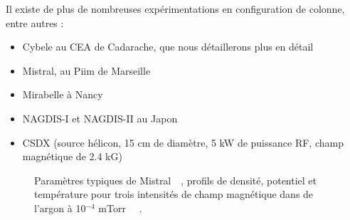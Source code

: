 \begin{refsection}
Il existe de plus de nombreuses expérimentations en
configuration de colonne, entre autres :

\begin{itemize}
  \item Cybele au CEA de Cadarache, que nous détaillerons plus en détail
  \item Mistral, au Piim de
  Marseille\parencite{Pierre, PierreExp, Brochard, Oldenburger}
  \item Mirabelle à Nancy~\parencite{Bousselin}
  \item NAGDIS-I et NAGDIS-II au Japon~\parencite{nishijimamodelling}
  \item CSDX (source hélicon, 15 cm de diamètre, 5 kW de puissance RF, champ
  magnétique de 2.4 kG)~\parencite{CSDX}
 \end{itemize}

\begin{figure}[!htbp] 
  \centering
    \caption{Paramètres typiques de Mistral~~, profils de
    densité, potentiel et température pour trois intensités
    de champ magnétique dans de l'argon à 10$^{-4}$
    mTorr~~
    \parencite{Oldenburger}.}
    \label{4-MistralExp}
\end{figure}


\end{refsection}
